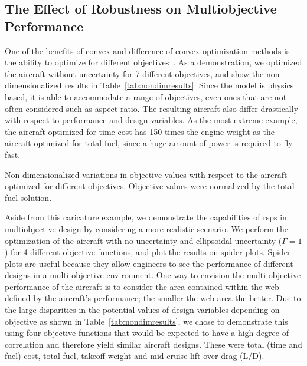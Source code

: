 \subsection{The Effect of Robustness on Multiobjective Performance}

One of the benefits of convex and difference-of-convex optimization methods is the ability to optimize for
different objectives~\cite{York2018}. As a demonstration, we optimized the aircraft without uncertainty
for 7 different objectives, and show
the non-dimensionalized results in Table~\ref{tab:nondimresults}.
Since the model is physics based, it is able to accommodate a range of objectives,
even ones that are not often considered such as aspect ratio. The resulting aircraft
also differ drastically with respect to performance and design variables.
As the most extreme example,
the aircraft optimized for time cost has 150 times the engine weight as the aircraft
optimized for total fuel, since a huge amount of power is required to fly fast.

\begin{table}
\caption{Non-dimensionalized variations in objective values with respect to the aircraft optimized
for different objectives. Objective values were normalized by the total fuel solution.}
    \label{tab:nondimresults}
\end{table}

Aside from this caricature example, we demonstrate the capabilities of \gls{rsp}s in
multiobjective design by considering a more realistic scenario.
We perform the optimization of the aircraft with no uncertainty and ellipsoidal uncertainty ($\Gamma = 1$)
for 4 different objective functions, and plot the results on spider plots.
Spider plots are useful because they allow engineers to see the performance of
different designs in a multi-objective
environment. One way to envision the multi-objective
performance of the aircraft is to consider the area contained within the web defined by the aircraft's
performance; the smaller the web area the better.
Due to the large disparities in the potential values of design variables depending
on objective as shown in Table~\ref{tab:nondimresults}, we chose to demonstrate this using four objective functions
that would be expected to have a high degree of correlation and therefore yield similar aircraft designs. These were
total (time and fuel) cost, total fuel, takeoff weight and mid-cruise lift-over-drag (L/D).

